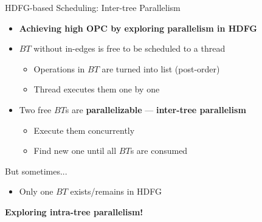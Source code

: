 \documentclass{beamer}
\begin{document}
\begin{CJK}{UTF8}{bkai}
            \begin{frame}{HDFG-based Scheduling: Inter-tree Parallelism}
                \begin{itemize}
                        \pause
                    \item \textbf{Achieving high OPC by exploring parallelism in HDFG}
                        \pause
                    \item {$BT$ without in-edges is free to be scheduled to a thread
                            \begin{itemize}
                                \item Operations in $BT$ are turned into list (post-order)
                                \item Thread executes them one by one
                            \end{itemize}
                        }
                        \pause
                    \item {Two free $BT$s are \textbf{parallelizable} --- \textbf{inter-tree parallelism}
                            \begin{itemize}
                                \item Execute them concurrently
                                \item Find new one until all $BT$s are consumed
                            \end{itemize}
                        }
                \end{itemize}
                \pause
                But sometimes...
                \begin{itemize}
                    \pause
                    \item {Only one $BT$ exists/remains in HDFG}
                \end{itemize}
                \pause
                \begin{center}
                \large{{\textbf{Exploring intra-tree parallelism!}}}
                \end{center}
            \end{frame}


\end{CJK}
\end{document}
